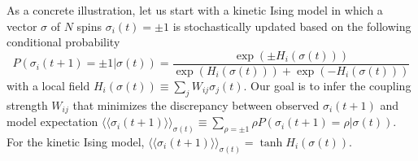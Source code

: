 \documentclass[prx,twocolumn,twoside,showpacs,superscriptaddress]{revtex4-1}
\begin{document}
%
As a concrete illustration, let us start with a kinetic Ising model in which a vector $\sigma$ of $N$ spins $\sigma_i(t)=\pm1$ is stochastically updated based on the following conditional probability
\begin{equation}
\label{eq:kIsingProb}
P(\sigma_i(t+1)=\pm1|\sigma(t)) = \frac{\exp (\pm H_i(\sigma(t)))}{\exp(H_i(\sigma(t))) + \exp(-H_i(\sigma(t)))}
\end{equation}
with a local field $H_i(\sigma(t)) \equiv \sum_j W_{ij} \sigma_j(t) $. %
Our goal is to infer the coupling strength $W_{ij}$ that minimizes the discrepancy between observed $\sigma_i(t+1)$ and model expectation ${\langle \langle \sigma_i(t+1) \rangle \rangle_{\sigma(t)}}\equiv \sum_{\rho=\pm1} \rho P(\sigma_i(t+1)=\rho|\sigma(t)).$ For the kinetic Ising model, ${\langle \langle \sigma_i(t+1) \rangle \rangle_{\sigma(t)}}=\tanh H_i(\sigma(t)).$ 

\end{document}
